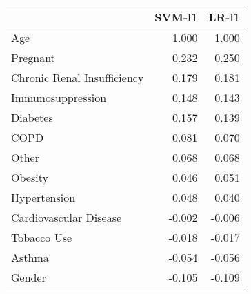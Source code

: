 \begin{tabular}{lrr}
\toprule
{} &  SVM-l1 &  LR-l1 \\
\midrule
Age                         &   1.000 &  1.000 \\
Pregnant                    &   0.232 &  0.250 \\
Chronic Renal Insufficiency &   0.179 &  0.181 \\
Immunosuppression           &   0.148 &  0.143 \\
Diabetes                    &   0.157 &  0.139 \\
COPD                        &   0.081 &  0.070 \\
Other                       &   0.068 &  0.068 \\
Obesity                     &   0.046 &  0.051 \\
Hypertension                &   0.048 &  0.040 \\
Cardiovascular Disease      &  -0.002 & -0.006 \\
Tobacco Use                 &  -0.018 & -0.017 \\
Asthma                      &  -0.054 & -0.056 \\
Gender                      &  -0.105 & -0.109 \\
\bottomrule
\end{tabular}
